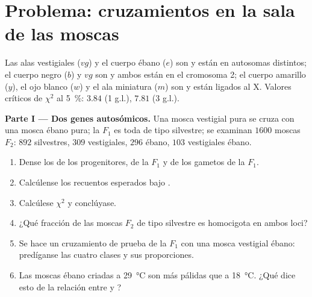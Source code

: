 \section{Problema: cruzamientos en la sala de las moscas}

\begin{problem}
\label{pb:b2:meiosis-heredity:1}
Las alas vestigiales ($vg$) y el cuerpo ébano ($e$) son  y están
en autosomas distintos; el cuerpo negro ($b$) y $vg$ son  y
ambos están en el cromosoma 2; el cuerpo amarillo ($y$), el ojo blanco
($w$) y el ala miniatura ($m$) son  y están ligados al X.
Valores críticos de $\chi^2$ al
\qty{5}{\%}: $3.84$ (1 g.l.), $7.81$ (3 g.l.).

\medskip
\noindent\textbf{Parte I --- Dos genes autosómicos.}
Una mosca vestigial pura se cruza con una mosca ébano pura; la $F_1$ es
toda de tipo silvestre; se examinan $1600$ moscas $F_2$: $892$ silvestres,
$309$ vestigiales, $296$ ébano, $103$ vestigiales ébano.
\begin{enumerate}
  \item Dense los  de los progenitores, de la $F_1$ y de los
        gametos de la $F_1$.
  \item Calcúlense los recuentos esperados bajo .
  \item Calcúlese $\chi^2$ y conclúyase.
  \item ¿Qué fracción de las moscas $F_2$ de tipo silvestre es homocigota
        en ambos loci?
  \item Se hace un cruzamiento de prueba de la $F_1$ con una mosca
        vestigial ébano: predíganse las cuatro clases y sus proporciones.
  \item Las moscas ébano criadas a \qty{29}{\celsius} son más pálidas que
        a \qty{18}{\celsius}. ¿Qué dice esto de la relación entre
         y ?
\end{enumerate}


\end{problem}
